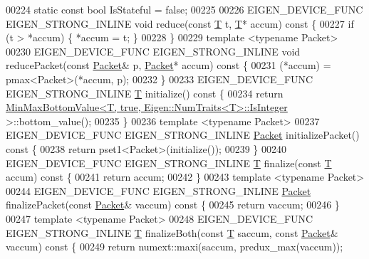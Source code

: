 \begin{DoxyCode}
00224   \textcolor{keyword}{static} \textcolor{keyword}{const} \textcolor{keywordtype}{bool} IsStateful = \textcolor{keyword}{false};
00225 
00226   EIGEN\_DEVICE\_FUNC EIGEN\_STRONG\_INLINE \textcolor{keywordtype}{void} reduce(\textcolor{keyword}{const} \hyperlink{group___sparse_core___module}{T} t, \hyperlink{group___sparse_core___module}{T}* accum)\textcolor{keyword}{ const }\{
00227     \textcolor{keywordflow}{if} (t > *accum) \{ *accum = t; \}
00228   \}
00229   \textcolor{keyword}{template} <\textcolor{keyword}{typename} Packet>
00230   EIGEN\_DEVICE\_FUNC EIGEN\_STRONG\_INLINE \textcolor{keywordtype}{void} reducePacket(\textcolor{keyword}{const} \hyperlink{union_eigen_1_1internal_1_1_packet}{Packet}& p, 
      \hyperlink{union_eigen_1_1internal_1_1_packet}{Packet}* accum)\textcolor{keyword}{ const }\{
00231     (*accum) = pmax<Packet>(*accum, p);
00232   \}
00233   EIGEN\_DEVICE\_FUNC EIGEN\_STRONG\_INLINE \hyperlink{group___sparse_core___module}{T} initialize()\textcolor{keyword}{ const }\{
00234     \textcolor{keywordflow}{return} \hyperlink{struct_eigen_1_1internal_1_1_min_max_bottom_value}{MinMaxBottomValue<T, true, Eigen::NumTraits<T>::IsInteger}
      >::bottom\_value();
00235   \}
00236   \textcolor{keyword}{template} <\textcolor{keyword}{typename} Packet>
00237   EIGEN\_DEVICE\_FUNC EIGEN\_STRONG\_INLINE \hyperlink{union_eigen_1_1internal_1_1_packet}{Packet} initializePacket()\textcolor{keyword}{ const }\{
00238     \textcolor{keywordflow}{return} pset1<Packet>(initialize());
00239   \}
00240   EIGEN\_DEVICE\_FUNC EIGEN\_STRONG\_INLINE \hyperlink{group___sparse_core___module}{T} finalize(\textcolor{keyword}{const} \hyperlink{group___sparse_core___module}{T} accum)\textcolor{keyword}{ const }\{
00241     \textcolor{keywordflow}{return} accum;
00242   \}
00243   \textcolor{keyword}{template} <\textcolor{keyword}{typename} Packet>
00244   EIGEN\_DEVICE\_FUNC EIGEN\_STRONG\_INLINE \hyperlink{union_eigen_1_1internal_1_1_packet}{Packet} finalizePacket(\textcolor{keyword}{const} \hyperlink{union_eigen_1_1internal_1_1_packet}{Packet}& vaccum)\textcolor{keyword}{ const }\{
00245     \textcolor{keywordflow}{return} vaccum;
00246   \}
00247   \textcolor{keyword}{template} <\textcolor{keyword}{typename} Packet>
00248   EIGEN\_DEVICE\_FUNC EIGEN\_STRONG\_INLINE \hyperlink{group___sparse_core___module}{T} finalizeBoth(\textcolor{keyword}{const} \hyperlink{group___sparse_core___module}{T} saccum, \textcolor{keyword}{const} 
      \hyperlink{union_eigen_1_1internal_1_1_packet}{Packet}& vaccum)\textcolor{keyword}{ const }\{
00249     \textcolor{keywordflow}{return} numext::maxi(saccum, predux\_max(vaccum));

\end{DoxyCode}
